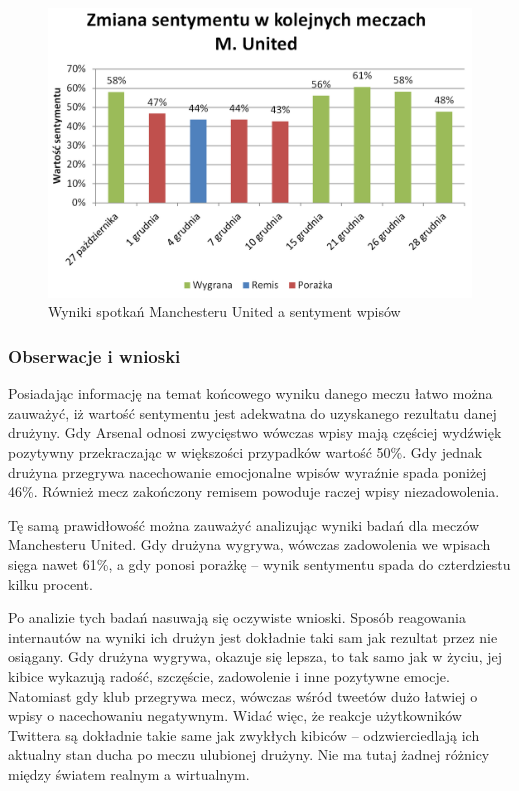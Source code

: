 \begin{figure}[ht!]
\centering
\includegraphics[width=120mm]{img/pozytywnosc-munited2.png}
\caption{Wyniki spotkań Manchesteru United a sentyment wpisów}
\label{image:pozytywnosc-munited}
\end{figure}

\subsubsection{Obserwacje i wnioski}
Posiadając informację na temat końcowego wyniku danego meczu łatwo można 
zauważyć, iż wartość sentymentu jest adekwatna do uzyskanego rezultatu danej 
drużyny. Gdy Arsenal odnosi zwycięstwo wówczas wpisy mają częściej wydźwięk
pozytywny przekraczając w większości przypadków wartość 50\%. Gdy jednak 
drużyna przegrywa nacechowanie emocjonalne wpisów wyraźnie spada poniżej 46\%.
Również mecz zakończony remisem powoduje raczej wpisy niezadowolenia.
 
Tę samą prawidłowość można zauważyć analizując wyniki badań dla meczów
Manchesteru United. Gdy drużyna wygrywa, wówczas zadowolenia we wpisach sięga
nawet 61\%, a gdy ponosi porażkę -- wynik sentymentu spada do czterdziestu kilku
procent.

Po analizie tych badań nasuwają się oczywiste wnioski. Sposób reagowania
internautów na wyniki ich drużyn jest dokładnie taki sam jak rezultat przez nie
osiągany. Gdy drużyna wygrywa, okazuje się lepsza, to tak samo jak w życiu, jej
kibice wykazują radość, szczęście, zadowolenie i inne pozytywne emocje.
Natomiast gdy klub przegrywa mecz, wówczas wśród tweetów dużo łatwiej o wpisy o
nacechowaniu negatywnym. Widać więc, że reakcje użytkowników Twittera są
dokładnie takie same jak zwykłych kibiców -- odzwierciedlają ich aktualny stan
ducha po meczu ulubionej drużyny. Nie ma tutaj żadnej różnicy między światem
realnym a wirtualnym.















